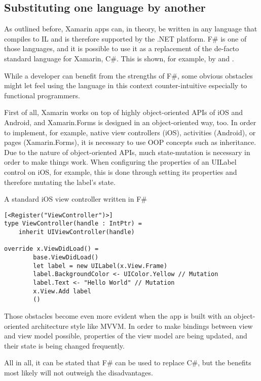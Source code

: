 \subsection{Substituting one language by another}

As outlined before, Xamarin apps can, in theory, be written in any language that compiles to IL and is therefore supported by the .NET platform. F\# is one of those languages, and it is possible to use it as a replacement of the de-facto standard language for Xamarin, C\#. This is shown, for example, by \cite{petzold_writing_2015} and \cite{shackles_you_2017}.

While a developer can benefit from the strengths of F\#, some obvious obstacles might let feel using the language in this context counter-intuitive especially to functional programmers.

First of all, Xamarin works on top of highly object-oriented APIs of iOS and Android, and Xamarin.Forms is designed in an object-oriented way, too. In order to implement, for example, native view controllers (iOS), activities (Android), or pages (Xamarin.Forms), it is necessary to use OOP concepts such as inheritance. Due to the nature of object-oriented APIs, much state-mutation is necessary in order to make things work. When configuring the properties of an UILabel control on iOS, for example, this is done through setting its properties and therefore mutating the label's state.

\begin{listing}[H]
\caption{A standard iOS view controller written in F\#}
\begin{verbatim}
[<Register("ViewController")>]
type ViewController(handle : IntPtr) =
    inherit UIViewController(handle)

override x.ViewDidLoad() = 
        base.ViewDidLoad()
        let label = new UILabel(x.View.Frame)
        label.BackgroundColor <- UIColor.Yellow // Mutation
        label.Text <- "Hello World" // Mutation
        x.View.Add label
        ()
\end{verbatim}
\end{listing}

Those obstacles become even more evident when the app is built with an object-oriented architecture style like MVVM. In order to make bindings between view and view model possible, properties of the view model are being updated, and their state is being changed frequently.

All in all, it can be stated that F\# can be used to replace C\#, but the benefits most likely will not outweigh the disadvantages.
